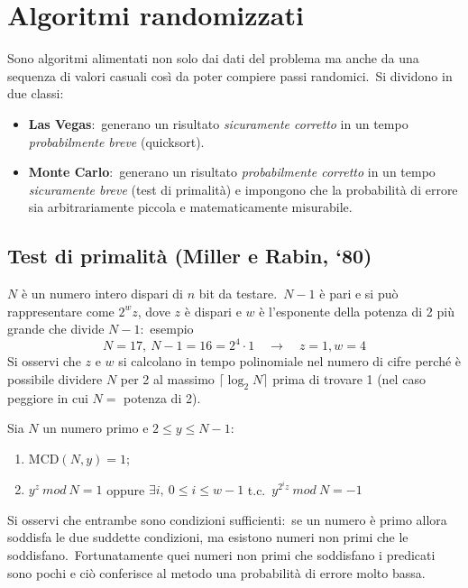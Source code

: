 \chapter{Algoritmi randomizzati}

Sono algoritmi alimentati non solo dai dati del problema ma anche da una sequenza di valori casuali così da poter compiere passi randomici.\
Si dividono in due classi:

\begin{itemize}
    \item  \textbf{Las Vegas}:\ generano un risultato \textit{sicuramente corretto} in un tempo \textit{probabilmente breve} (quicksort).
    \item  \textbf{Monte Carlo}:\ generano un risultato \textit{probabilmente corretto} in un tempo \textit{sicuramente breve} (test di primalità) e impongono che la probabilità di errore sia arbitrariamente piccola e matematicamente misurabile.
\end{itemize}

\section{Test di primalità (Miller e Rabin, `80)}

$N$ è un numero intero dispari di $n$ bit da testare.\
$N-1$ è pari e si può rappresentare come $2^wz$, dove $z$ è dispari e $w$ è l'esponente della potenza di 2 più grande che divide $N-1$:\ esempio
\[N=17,\ N-1=16 = 2^4\cdot 1\quad\rightarrow\quad z=1,w=4\]
Si osservi che $z$ e $w$ si calcolano in tempo polinomiale nel numero di cifre perché è possibile dividere $N$ per 2 al massimo $\lceil\log_2N\rceil$ prima di trovare 1 (nel caso peggiore in cui $N =$ potenza di 2).

\vspace{12pt}
Sia $N$ un numero primo e $2\leq y \leq N-1$:
\begin{enumerate}
    \item $\mathrm{MCD}(N,y)=1$;
    \item $y^z\ \mathit{mod}\ N = 1$ oppure $\exists i,\ 0\leq i\leq w - 1$ t.c.\ $y^{2^iz}\ \mathit{mod}\ N = -1$
\end{enumerate}

\vspace{12pt}
\noindent Si osservi che entrambe sono condizioni sufficienti:\ se un numero è primo allora soddisfa le due suddette condizioni, ma esistono numeri non primi che le soddisfano.\
Fortunatamente quei numeri non primi che soddisfano i predicati sono pochi e ciò conferisce al metodo una probabilità di errore molto bassa.\

